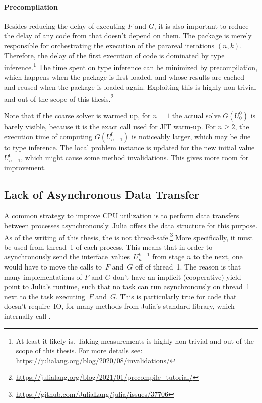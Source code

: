 \paragraph{Precompilation}

Besides reducing the delay of executing $F$ and $G$,
it is also important to reduce the delay of any code from  that doesn't depend on them.
The package is merely responsible for orchestrating the execution of the parareal iterations $(n,k)$.
Therefore, the delay of the first execution of  code is dominated by type inference.\footnote{%
  At least it likely is. Taking measurements is highly non-trivial and out of the scope of this thesis.
  For more details see: \url{https://julialang.org/blog/2020/08/invalidations/}
}
The time spent on type inference can be minimized by precompilation,
which happens when the package is first loaded,
and whose results are cached and reused when the package is loaded again.
Exploiting this is highly non-trivial and out of the scope of this thesis.\footnote{\url{https://julialang.org/blog/2021/01/precompile_tutorial/}}



Note that if the coarse solver is warmed up,
for $n=1$ the actual solve $G(U_0^0)$ is barely visible,
because it is the exact call used for \ac{JIT} warm-up.
For $n\geq 2$, the execution time of computing $G(U_{n-1}^0)$ is noticeably larger,
which may be due to type inference.
The local problem instance is updated for the new initial value $U_{n-1}^0$,
which might cause some method invalidations.
This gives more room for improvement.

\subsection{Lack of Asynchronous Data Transfer}

A common strategy to improve CPU utilization is to perform data transfers between processes asynchronously.
Julia offers the  data structure for this purpose.
As of the writing of this thesis,
the  is not thread-safe.\footnote{\url{https://github.com/JuliaLang/julia/issues/37706}}
More specifically, it must be used from thread~1 of each process.
This means that in order to asynchronously send the interface~values~$U_n^{k+1}$ from stage $n$ to the next,
one would have to move the calls to~$F$ and~$G$ off of thread~1.
The reason is that many implementations of $F$ and $G$ don't have an implicit (cooperative) yield point to Julia's runtime,
such that no task can run asynchronously on thread~1 next to the task executing~$F$ and~$G$.
This is particularly true for code that doesn't require~\ac{IO},
\eg for many methods from Julia's  standard library,
which internally call .

